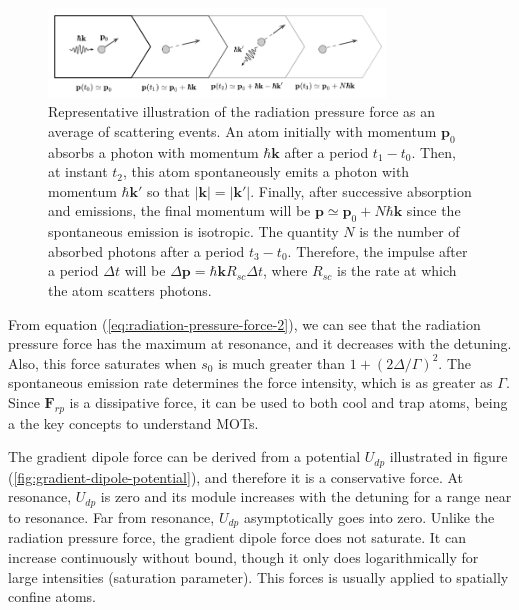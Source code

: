 {\begin{figure}[!ht]
	\centering
	\includegraphics[width=0.8\textwidth]{USPSC-img/radiation_pressure_force.png}
	\vspace{5pt}
	\caption{Representative illustration of the radiation pressure force as an average of scattering events. An atom initially with momentum $ \mathbf{p}_0 $ absorbs a photon with momentum $ \hbar \mathbf{k} $ after a period $ t_1 - t_0 $. Then, at instant $ t_2 $, this atom spontaneously emits a photon with momentum $ \hbar \mathbf{k}' $ so that $ |\mathbf{k}| = |\mathbf{k}'| $. Finally, after successive absorption and emissions, the final momentum will be $ \mathbf{p} \simeq \mathbf{p}_0 + N\hbar\mathbf{k} $ since the spontaneous emission is isotropic. The quantity $ N $ is the number of absorbed photons after a period $ t_3 - t_0 $. Therefore, the impulse after a period $ \Delta t $ will be $ \Delta \mathbf{p} = \hbar \mathbf{k} R_{sc} \Delta t $, where $ R_{sc} $ is the rate at which the atom scatters photons.}
	\label{fig:radiation-pressure-force}
	\vspace{-15pt}
\end{figure}

From equation (\ref{eq:radiation-pressure-force-2}), we can see that the radiation pressure force has the maximum at resonance, and it decreases with the detuning. Also, this force saturates when $ s_0 $ is much greater than $ 1 + (2\Delta / \Gamma)^2 $. The spontaneous emission rate determines the force intensity, which is as greater as $ \Gamma $. Since $ \mathbf{F}_{rp} $ is a dissipative force, it can be used to both cool and trap atoms, being a the key concepts to understand MOTs.

The gradient dipole force can be derived from a potential $ U_{dp} $ illustrated in figure (\ref{fig:gradient-dipole-potential}), and therefore it is a conservative force. At resonance, $ U_{dp} $ is zero and its module increases with the detuning for a range near to resonance. Far from resonance, $ U_{dp} $ asymptotically goes into zero. Unlike the radiation pressure force, the gradient dipole force does not saturate. It can increase continuously without bound, though it only does logarithmically for large intensities (saturation parameter). This forces is usually applied to spatially confine atoms.

}
